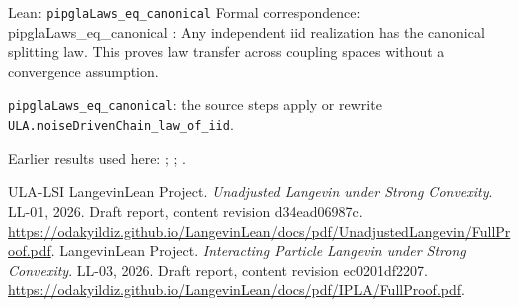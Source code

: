 \documentclass[11pt,a4paper]{article}
\begin{document}
\begin{leanbox}{Lean: \texttt{pipglaLaws\_\allowbreak{}eq\_\allowbreak{}canonical}}
Formal correspondence: pipglaLaws\_eq\_canonical : Any independent iid realization has the canonical splitting law. This proves law transfer across coupling spaces without a convergence assumption.



\texttt{pipgla\allowbreak{}Laws\_\allowbreak{}eq\_\allowbreak{}canonical}: the source steps apply or rewrite \texttt{ULA.\allowbreak{}noise\allowbreak{}Driven\allowbreak{}Chain\_\allowbreak{}law\_\allowbreak{}of\_\allowbreak{}iid}.
\end{leanbox}


Earlier results used here: \cite[Section~3.20.5]{LangevinLean2026ULASC}; \cite[Section~3.20.8]{LangevinLean2026ULASC}; \cite[Section~3.1.1]{LangevinLean2026IPLA}.

\begin{thebibliography}{ULA-LSI}
LangevinLean Project. \emph{Unadjusted Langevin under Strong Convexity}. LL-01, 2026. Draft report, content revision d34ead06987c. \url{https://odakyildiz.github.io/LangevinLean/docs/pdf/UnadjustedLangevin/FullProof.pdf}.
LangevinLean Project. \emph{Interacting Particle Langevin under Strong Convexity}. LL-03, 2026. Draft report, content revision ec0201df2207. \url{https://odakyildiz.github.io/LangevinLean/docs/pdf/IPLA/FullProof.pdf}.
\end{thebibliography}
\end{document}
